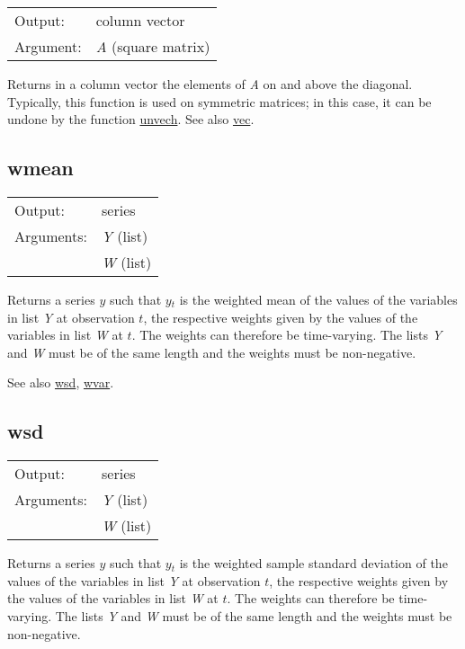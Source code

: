 \begin{tabular}{ll}
Output:     & column vector\\
Argument:   & \textsl{A} (square matrix)\\
\end{tabular}

	  Returns in a column vector the elements of \textsl{A}
	  on and above the diagonal. Typically, this function is used on
	  symmetric matrices; in this case, it can be undone by the
	  function \hyperlink{func-unvech}{unvech}. 
	  See also \hyperlink{func-vec}{vec}.

\subsection{wmean}
\hypertarget{func-wmean}{}

\begin{tabular}{ll}
Output:     & series\\
Arguments:  & \textsl{Y} (list)\\
           & \textsl{W} (list)\\
\end{tabular}

	  Returns a series \ensuremath{y} such that \ensuremath{y}\ensuremath{_{t}}
	  is the weighted mean of the values of the variables in list
	  \textsl{Y} at observation \ensuremath{t}, the respective
	  weights given by the values of the variables in list
	  \textsl{W} at \ensuremath{t}.  The weights can therefore
	  be time-varying. The lists \textsl{Y} and
	  \textsl{W} must be of the same length and the weights must
	  be non-negative.

	  See also \hyperlink{func-wsd}{wsd}, \hyperlink{func-wvar}{wvar}.

\subsection{wsd}
\hypertarget{func-wsd}{}

\begin{tabular}{ll}
Output:     & series\\
Arguments:  & \textsl{Y} (list)\\
           & \textsl{W} (list)\\
\end{tabular}

	  Returns a series \ensuremath{y} such that \ensuremath{y}\ensuremath{_{t}}
	  is the weighted sample standard deviation of the values of the
	  variables in list \textsl{Y} at observation
	  \ensuremath{t}, the respective weights given by the values of the
	  variables in list \textsl{W} at \ensuremath{t}.  The
	  weights can therefore be time-varying. The lists
	  \textsl{Y} and \textsl{W} must be of the same
	  length and the weights must be non-negative.

